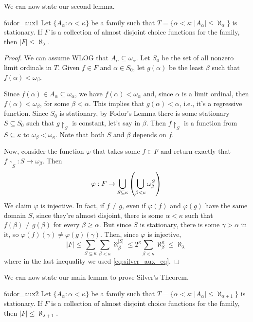 We can now state our second lemma.

\begin{lemma}{}{fodor_aux1}
    Let $\{A_\alpha:\alpha<\kappa\}$ be a family such that $T=\{\alpha<\kappa:\lvert A_\alpha\rvert\leq\aleph_\alpha\}$ is stationary. If $F$ is a collection of almost disjoint choice functions for the family, then $\lvert F\rvert\leq\aleph_\lambda$.
\end{lemma}

\begin{proof}
    We can assume WLOG that $A_\alpha\subseteq\omega_\alpha$. Let $S_0$ be the set of all nonzero limit ordinals in $T$. Given $f\in F$ and $\alpha\in S_0$, let $g(\alpha)$ be the least $\beta$ such that $f(\alpha)<\omega_\beta$.

    Since $f(\alpha)\in A_\alpha\subseteq\omega_\alpha$, we have $f(\alpha)<\omega_\alpha$ and, since $\alpha$ is a limit ordinal, then $f(\alpha)<\omega_\beta$, for some $\beta<\alpha$. This implies that $g(\alpha)<\alpha$, i.e., it's a regressive function. Since $S_0$ is stationary, by Fodor's Lemma there is some stationary $S\subseteq S_0$ such that $g\restriction_S$ is constant, let's say in $\beta$. Then $f\restriction_S$ is a function from $S\subseteq\kappa$ to $\omega_\beta<\omega_\kappa$. Note that both $S$ and $\beta$ depends on $f$.

    Now, consider the function $\varphi$ that takes some $f\in F$ and return exactly that $f\restriction_S:S\to\omega_\beta$. Then
    $$\varphi:F\to\bigcup_{S\subseteq\kappa}{\left(\bigcup_{\beta<\kappa}\omega_\beta^S\right)}$$
    We claim $\varphi$ is injective. In fact, if $f\neq g$, even if $\varphi(f)$ and $\varphi(g)$ have the same domain $S$, since they're almost disjoint, there is some $\alpha<\kappa$ such that $f(\beta)\neq g(\beta)$ for every $\beta\geq\alpha$. But since $S$ is stationary, there is some $\gamma>\alpha$ in it, so $\varphi(f)(\gamma)\neq\varphi(g)(\gamma)$. Then, since $\varphi$ is injective,
    $$\lvert F\rvert\leq\sum_{S\subseteq\kappa}\sum_{\beta<\kappa}\aleph_\beta^{\lvert S\rvert}\leq 2^\kappa\sum_{\beta<\kappa}\aleph_\beta^\kappa\leq\aleph_\lambda$$
    where in the last inequality we used \cref{eq:silver_aux_eq}.
\end{proof}

We can now state our main lemma to prove Silver's Theorem.

\begin{lemma}{}{fodor_aux2}
    Let $\{A_\alpha:\alpha<\kappa\}$ be a family such that $T=\{\alpha<\kappa:\lvert A_\alpha\rvert\leq\aleph_{\alpha+1}\}$ is stationary. If $F$ is a collection of almost disjoint choice functions for the family, then $\lvert F\rvert\leq\aleph_{\lambda+1}$.
\end{lemma}

